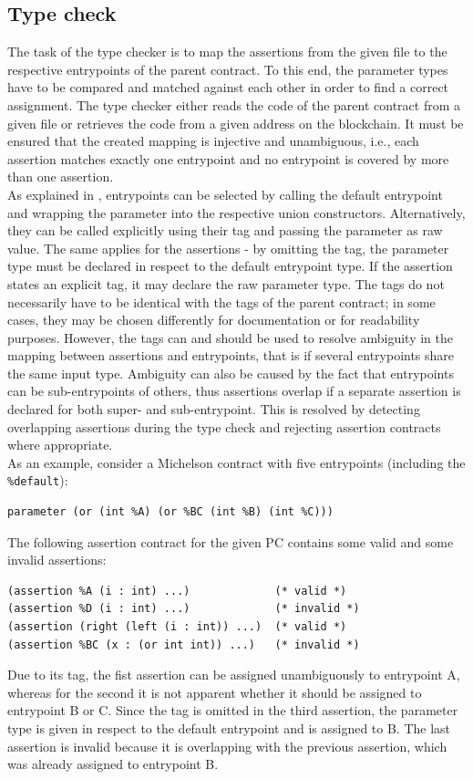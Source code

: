 \subsection{Type check}\label{sec:typecheck}
The task of the type checker is to map the assertions from the given file to the respective entrypoints of the parent contract. To this end, the parameter types have to be compared and matched against each other in order to find a correct assignment. The type checker either reads the code of the parent contract from a given file or retrieves the code from a given address on the blockchain. It must be ensured that the created mapping is injective and unambiguous, i.e., each assertion matches exactly one entrypoint and no entrypoint is covered by more than one assertion.\\
As explained in , entrypoints can be selected by calling the default entrypoint and wrapping the parameter into the respective union constructors. Alternatively, they can be called explicitly using their tag and passing the parameter as raw value. The same applies for the assertions - by omitting the tag, the parameter type must be declared in respect to the default entrypoint type. If the assertion states an explicit tag, it may declare the raw parameter type. The tags do not necessarily have to be identical with the tags of the parent contract; in some cases, they may be chosen differently for documentation or for readability purposes. However, the tags can and should be used to resolve ambiguity in the mapping between assertions and entrypoints, that is if several entrypoints share the same input type. Ambiguity can also be caused by the fact that entrypoints can be sub-entrypoints of others, thus assertions overlap if a separate assertion is declared for both super- and sub-entrypoint. This is resolved by detecting overlapping assertions during the type check and rejecting assertion contracts where appropriate. \\
As an example, consider a Michelson contract with five entrypoints (including the \texttt{\%default}):
\begin{lstlisting}[numbers=none, language=Michelson]
parameter (or (int %A) (or %BC (int %B) (int %C)))
\end{lstlisting}
The following assertion contract for the given PC contains some valid and some invalid assertions:
\begin{lstlisting}[language=Assertion]
(assertion %A (i : int) ...)             (* valid *)
(assertion %D (i : int) ...)             (* invalid *)
(assertion (right (left (i : int)) ...)  (* valid *)
(assertion %BC (x : (or int int)) ...)   (* invalid *)
\end{lstlisting}
Due to its tag, the fist assertion can be assigned unambiguously to entrypoint A, whereas for the second it is not apparent whether it should be assigned to entrypoint B or C. Since the tag is omitted in the third assertion, the parameter type is given in respect to the default entrypoint and is assigned to B. The last assertion is invalid because it is overlapping with the previous assertion, which was already assigned to entrypoint B.

